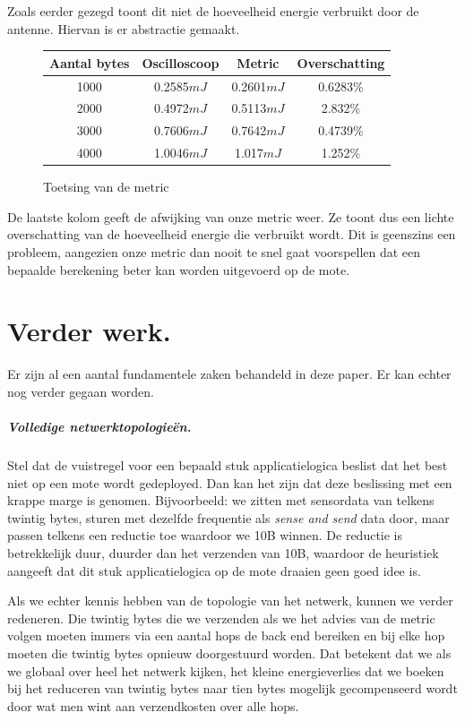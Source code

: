 \documentclass[11pt]{article}
\begin{document}
Zoals eerder gezegd toont dit niet de hoeveelheid energie verbruikt door de antenne. Hiervan is er abstractie gemaakt. 

\begin{figure}[H]
\begin{tabular}{|c|c|c|c|}
\hline 
\cellcolor[gray]{0.8}Aantal bytes & \cellcolor[gray]{0.8} Oscilloscoop  & \cellcolor[gray]{0.8} Metric & \cellcolor[gray]{0.8} Overschatting \\ 
\hline 
1000 & 0.2585$mJ$ & 0.2601$mJ$ & 0.6283\% \\ 
\hline 
2000 & 0.4972$mJ$ & 0.5113$mJ$ & 2.832\% \\ 
\hline 
3000 & 0.7606$mJ$ & 0.7642$mJ$ & 0.4739\% \\ 
\hline 
4000 & 1.0046$mJ$ & 1.017$mJ$ & 1.252\% \\ 
\hline 
\end{tabular} 

\caption{Toetsing van de metric}
\label{tab:toetsing}
\end{figure}

De laatste kolom geeft de afwijking van onze metric weer. Ze toont dus een
lichte overschatting van de hoeveelheid energie die verbruikt wordt. Dit is
geenszins een probleem, aangezien onze metric dan nooit te snel gaat voorspellen dat
een bepaalde berekening beter kan worden uitgevoerd op de mote.

\section{Verder werk.} 

Er zijn al een aantal fundamentele zaken behandeld in deze paper. Er kan
echter nog verder gegaan worden.
 
\subparagraph{Volledige netwerktopologie\"en.}

Stel dat de vuistregel voor een bepaald stuk applicatielogica beslist dat het
best niet op een mote wordt gedeployed. Dan kan het zijn dat deze beslissing met
een krappe marge is genomen. Bijvoorbeeld: we zitten met sensordata van telkens
twintig bytes, sturen met dezelfde frequentie als \textit{sense and send} data door, maar
passen telkens een reductie toe waardoor we 10B winnen. De reductie is
betrekkelijk duur, duurder dan het verzenden van 10B, waardoor de heuristiek
aangeeft dat dit stuk applicatielogica op de mote draaien geen goed idee is. 

Als we echter kennis hebben van de topologie van het netwerk, kunnen we verder
redeneren. Die twintig bytes die we verzenden als we het advies van de metric
volgen moeten immers via een aantal hops de back end bereiken en bij elke hop
moeten die twintig bytes opnieuw doorgestuurd worden. Dat betekent dat we als we
globaal over heel het netwerk kijken, het kleine energieverlies dat we boeken
bij het reduceren van twintig bytes naar tien bytes mogelijk gecompenseerd wordt
door wat men wint aan verzendkosten over alle hops.
\end{document}
